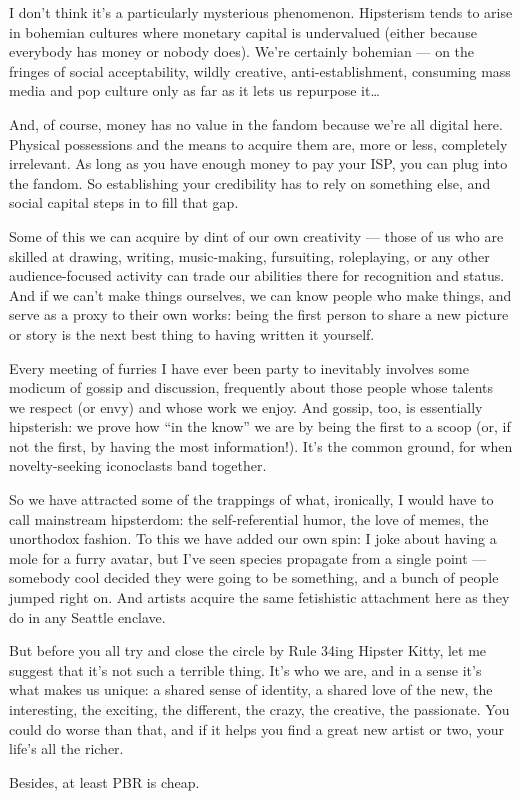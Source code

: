 I don't think it's a particularly mysterious phenomenon. Hipsterism tends to arise in bohemian cultures where monetary capital is undervalued (either because everybody has money or nobody does). We're certainly bohemian — on the fringes of social acceptability, wildly creative, anti-establishment, consuming mass media and pop culture only as far as it lets us repurpose it\ldots

And, of course, money has no value in the fandom because we're all digital here. Physical possessions and the means to acquire them are, more or less, completely irrelevant. As long as you have enough money to pay your ISP, you can plug into the fandom. So establishing your credibility has to rely on something else, and social capital steps in to fill that gap.

Some of this we can acquire by dint of our own creativity — those of us who are skilled at drawing, writing, music-making, fursuiting, roleplaying, or any other audience-focused activity can trade our abilities there for recognition and status. And if we can't make things ourselves, we can know people who make things, and serve as a proxy to their own works: being the first person to share a new picture or story is the next best thing to having written it yourself.

Every meeting of furries I have ever been party to inevitably involves some modicum of gossip and discussion, frequently about those people whose talents we respect (or envy) and whose work we enjoy. And gossip, too, is essentially hipsterish: we prove how ``in the know'' we are by being the first to a scoop (or, if not the first, by having the most information!). It's the common ground, for when novelty-seeking iconoclasts band together.

So we have attracted some of the trappings of what, ironically, I would have to call mainstream hipsterdom: the self-referential humor, the love of memes, the unorthodox fashion. To this we have added our own spin: I joke about having a mole for a furry avatar, but I've seen species propagate from a single point — somebody cool decided they were going to be something, and a bunch of people jumped right on. And artists acquire the same fetishistic attachment here as they do in any Seattle enclave.

But before you all try and close the circle by Rule 34ing Hipster Kitty, let me suggest that it's not such a terrible thing. It's who we are, and in a sense it's what makes us unique: a shared sense of identity, a shared love of the new, the interesting, the exciting, the different, the crazy, the creative, the passionate. You could do worse than that, and if it helps you find a great new artist or two, your life's all the richer.

Besides, at least PBR is cheap.
